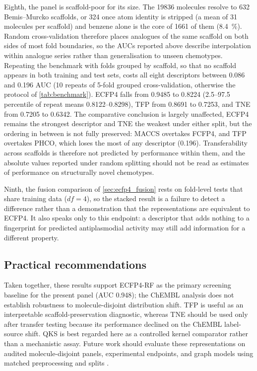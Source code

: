 \documentclass[11pt,a4paper]{article}
\begin{document}
Eighth, the panel is scaffold-poor for its size. The \num{19836} molecules resolve to \num{632} Bemis--Murcko scaffolds, or \num{324} once atom identity is stripped (a mean of \num{31} molecules per scaffold) and benzene alone is the core of \num{1661} of them (\qty{8.4}{\percent}). Random cross-validation therefore places analogues of the same scaffold on both sides of most fold boundaries, so the AUCs reported above describe interpolation within analogue series rather than generalisation to unseen chemotypes. Repeating the benchmark with folds grouped by scaffold, so that no scaffold appears in both training and test sets, costs all eight descriptors between \num{0.086} and \num{0.196} AUC (10 repeats of 5-fold grouped cross-validation, otherwise the protocol of \cref{tab:benchmark}). ECFP4 falls from \num{0.9485} to \num{0.8224} (2.5--97.5 percentile of repeat means \num{0.8122}--\num{0.8298}), TFP from \num{0.8691} to \num{0.7253}, and TNE from \num{0.7205} to \num{0.6342}. The comparative conclusion is largely unaffected, ECFP4 remains the strongest descriptor and TNE the weakest under either split, but the ordering in between is not fully preserved: MACCS overtakes FCFP4, and TFP overtakes PHCO, which loses the most of any descriptor (\num{0.196}). Transferability across scaffolds is therefore not predicted by performance within them, and the absolute values reported under random splitting should not be read as estimates of performance on structurally novel chemotypes.

Ninth, the fusion comparison of \cref{sec:ecfp4_fusion} rests on fold-level tests that share training data ($df = 4$), so the stacked result is a failure to detect a difference rather than a demonstration that the representations are equivalent to ECFP4. It also speaks only to this endpoint: a descriptor that adds nothing to a fingerprint for predicted antiplasmodial activity may still add information for a different property.

\subsection{Practical recommendations}

Taken together, these results support ECFP4-RF as the primary screening baseline for the present panel (AUC \num{0.948}); the ChEMBL analysis does not establish robustness to molecule-disjoint distribution shift. TFP is useful as an interpretable scaffold-preservation diagnostic, whereas TNE should be used only after transfer testing because its performance declined on the ChEMBL label-source shift. QKS is best regarded here as a controlled kernel comparator rather than a mechanistic assay. Future work should evaluate these representations on audited molecule-disjoint panels, experimental endpoints, and graph models using matched preprocessing and splits \citep{topologynet_2018}.
\end{document}
